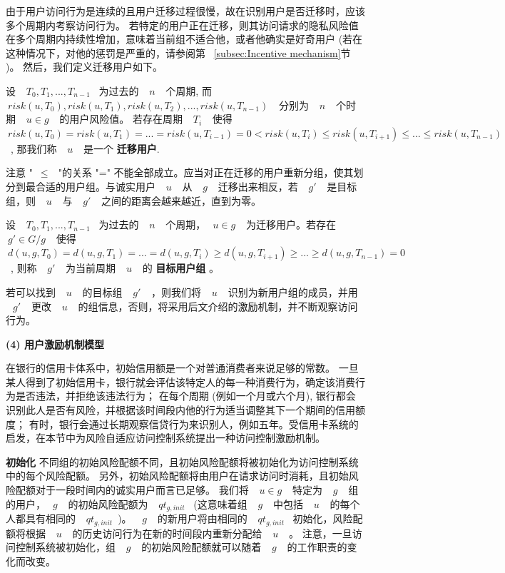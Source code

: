 由于用户访问行为是连续的且用户迁移过程很慢，故在识别用户是否迁移时，应该多个周期内考察访问行为。 若特定的用户正在迁移，则其访问请求的隐私风险值在多个周期内持续性增加，意味着当前组不适合他，或者他确实是好奇用户 (若在这种情况下，对他的惩罚是严重的，请参阅第 ~\ref{subsec:Incentive mechanism}节 )。 然后，我们定义迁移用户如下。

\begin{definition}%
	\label{def:migrating user}
	设 ~$~T_0,T_1,...,T_{n-1}$~ 为过去的 ~$~n~$~ 个周期, 而 ~$~risk(u,T_0),risk(u,T_1),risk(u,T_2),..., risk(u,T_{n-1})~$~ 分别为 ~$~n~$~ 个时期 ~$~u\in g~$~ 的用户风险值。 若存在周期 ~$~T_i~$~ 使得 ~$~risk(u,T_0) = risk(u,T_1) = ... = risk(u,T_{i-1}) =0  < risk(u,T_{i}) \leq risk(u,T_{i+1}) \leq ... \leq risk(u,T_{n-1})~$~, 那我们称 ~$~u~$~ 是一个 \textbf{迁移用户}.
\end{definition}

注意 "~$\leq~$~"的关系 "=" 不能全部成立。应当对正在迁移的用户重新分组，使其划分到最合适的用户组。与诚实用户 ~$~u~$~ 从 ~$~g~$~ 迁移出来相反，若 ~$~g'~$~ 是目标组，则 ~$~u~$~ 与 ~$~g'~$~ 之间的距离会越来越近，直到为零。

\begin{definition}%
	\label{def:target group}
	设 ~$~T_0,T_1,...,T_{n-1}$~ 为过去的 ~$~n~$~ 个周期，~$~u \in g~$~ 为迁移用户。若存在 ~$~g' \in G/g~$~ 使得 ~$~d(u,g,T_0) = d(u,g,T_1) = ... = d(u,g,T_i) \geq d(u,g,T_{i+1}) \geq ... \geq d(u,g,T_{n-1}) = 0~$~, 则称 ~$~g'~$~ 为当前周期 ~$~u~$~ 的 \textbf{目标用户组} 。 
\end{definition}

若可以找到 ~$~u~$~ 的目标组 ~$~g'~$~ ，则我们将 ~$~u~$~ 识别为新用户组的成员，并用 ~$~g'~$~ 更改 ~$~u~$~ 的组信息，否则，将采用后文介绍的激励机制，并不断观察访问行为。

\textbf{(4) 用户激励机制模型}


在银行的信用卡体系中，初始信用额是一个对普通消费者来说足够的常数。 一旦某人得到了初始信用卡，银行就会评估该特定人的每一种消费行为，确定该消费行为是否违法，并拒绝该违法行为； 在每个周期 (例如一个月或六个月), 银行都会识别此人是否有风险，并根据该时间段内他的行为适当调整其下一个期间的信用额度； 有时，银行会通过长期观察信贷行为来识别人，例如五年。受信用卡系统的启发，在本节中为风险自适应访问控制系统提出一种访问控制激励机制。

\textbf{初始化} 不同组的初始风险配额不同，且初始风险配额将被初始化为访问控制系统中的每个风险配额。 另外，初始风险配额将由用户在请求访问时消耗，且初始风险配额对于一段时间内的诚实用户而言已足够。 我们将 ~$~u \in g~$~ 特定为 ~$~g~$~ 组的用户，~$~g~$~ 的初始风险配额为 ~$~qt_{g,init}$~ (这意味着组 ~$~g~$~ 中包括 ~$~u~$~ 的每个人都具有相同的 ~$~qt_{g,init}$~)。 ~$~g~$~ 的新用户将由相同的 ~$~qt_{g,init}$~ 初始化，风险配额将根据 ~$~u~$~ 的历史访问行为在新的时间段内重新分配给 ~$~u~$~ 。 注意，一旦访问控制系统被初始化，组 ~$~g~$~ 的初始风险配额就可以随着 ~$~g~$~ 的工作职责的变化而改变。

